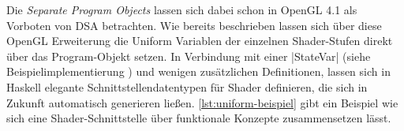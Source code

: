 Die \textit{Separate Program Objects} lassen sich dabei schon in OpenGL 4.1 als Vorboten von \ac{DSA} betrachten. Wie bereits beschrieben lassen sich über diese OpenGL Erweiterung die Uniform Variablen der einzelnen Shader-Stufen direkt über das Program-Objekt setzen. In Verbindung mit einer |StateVar| (siehe Beispielimplementierung ) und wenigen zusätzlichen Definitionen, lassen sich in Haskell elegante Schnittstellendatentypen für Shader definieren, die sich in Zukunft automatisch generieren ließen. \ref{lst:uniform-beispiel} gibt ein Beispiel wie sich eine Shader-Schnittstelle über funktionale Konzepte zusammensetzen lässt.

\endgroup
